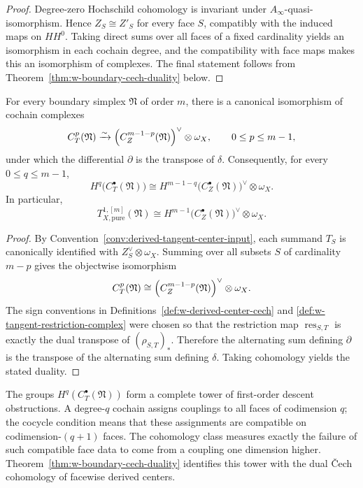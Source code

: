 \begin{proof}
Degree-zero Hochschild cohomology is invariant under $A_\infty$-quasi-isomorphism.  Hence
$Z_S\cong Z'_S$ for every face $S$, compatibly with the induced maps on $HH^0$.  Taking direct sums over all faces of a fixed cardinality yields an isomorphism in each cochain degree, and the compatibility with face maps makes this an isomorphism of complexes.  The final statement follows from Theorem~\ref{thm:w-boundary-cech-duality} below.
\end{proof}

\begin{theorem}
\label{thm:w-boundary-cech-duality}
For every boundary simplex $\mathfrak N$ of order $m$, there is a canonical isomorphism of cochain complexes
\[
C_T^p(\mathfrak N)
\xrightarrow{\sim}
\Bigl(C_Z^{m-1-p}(\mathfrak N)\Bigr)^\vee\otimes \omega_X,
\qquad 0\le p\le m-1,
\]
under which the differential $\partial$ is the transpose of $\delta$.
Consequently, for every $0\le q\le m-1$,
\[
H^q\bigl(C_T^\bullet(\mathfrak N)\bigr)
\cong
H^{m-1-q}\bigl(C_Z^\bullet(\mathfrak N)\bigr)^\vee\otimes \omega_X.
\]
In particular,
\[
T^{1,[m]}_{X,\mathrm{pure}}(\mathfrak N)
\cong
H^{m-1}\bigl(C_Z^\bullet(\mathfrak N)\bigr)^\vee\otimes \omega_X.
\]
\end{theorem}

\begin{proof}
By Convention~\ref{conv:derived-tangent-center-input}, each summand $T_S$ is canonically
identified with $Z_S^\vee\otimes \omega_X$.  Summing over all subsets $S$ of cardinality $m-p$
gives the objectwise isomorphism
\[
C_T^p(\mathfrak N)
\cong
\Bigl(C_Z^{m-1-p}(\mathfrak N)\Bigr)^\vee\otimes \omega_X.
\]
The sign conventions in Definitions~\ref{def:w-derived-center-cech} and
\ref{def:w-tangent-restriction-complex} were chosen so that the restriction map
$\operatorname{res}_{S,T}$ is exactly the dual transpose of $(\rho_{S,T})_*$.  Therefore the alternating
sum defining $\partial$ is the transpose of the alternating sum defining $\delta$.
Taking cohomology yields the stated duality.
\end{proof}

\begin{remark}[Interpretation]
\label{rem:w-boundary-cech-interpretation}
The groups $H^q(C_T^\bullet(\mathfrak N))$ form a complete tower of first-order descent obstructions.
A degree-$q$ cochain assigns couplings to all faces of codimension $q$; the cocycle condition means
that these assignments are compatible on codimension-$(q+1)$ faces.  The cohomology class measures
exactly the failure of such compatible face data to come from a coupling one dimension higher.
Theorem~\ref{thm:w-boundary-cech-duality} identifies this tower with the dual \v{C}ech cohomology of
facewise derived centers.
\end{remark}


